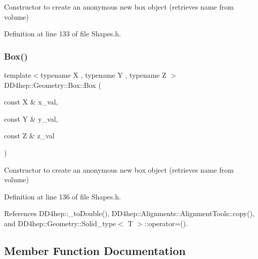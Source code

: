 Constructor to create an anonymous new box object (retrieves name from volume) 



Definition at line 133 of file Shapes.\+h.

\hypertarget{class_d_d4hep_1_1_geometry_1_1_box_aea21fe484b6c60ed5890b3c3d8b926bd}{}\label{class_d_d4hep_1_1_geometry_1_1_box_aea21fe484b6c60ed5890b3c3d8b926bd} 
\subsubsection{\texorpdfstring{Box()}{Box()}\hspace{0.1cm}{\footnotesize\ttfamily [6/6]}}
{\footnotesize\ttfamily template$<$typename X , typename Y , typename Z $>$ \\
D\+D4hep\+::\+Geometry\+::\+Box\+::\+Box (\begin{DoxyParamCaption}\item[{const X \&}]{x\+\_\+val,  }\item[{const Y \&}]{y\+\_\+val,  }\item[{const Z \&}]{z\+\_\+val }\end{DoxyParamCaption})\hspace{0.3cm}{\ttfamily [inline]}}



Constructor to create an anonymous new box object (retrieves name from volume) 



Definition at line 136 of file Shapes.\+h.



References D\+D4hep\+::\+\_\+to\+Double(), D\+D4hep\+::\+Alignments\+::\+Alignment\+Tools\+::copy(), and D\+D4hep\+::\+Geometry\+::\+Solid\+\_\+type$<$ T $>$\+::operator=().



\subsection{Member Function Documentation}
\hypertarget{class_d_d4hep_1_1_geometry_1_1_box_a063e53830dac233cfbd25c20772fc634}{}\label{class_d_d4hep_1_1_geometry_1_1_box_a063e53830dac233cfbd25c20772fc634} 
